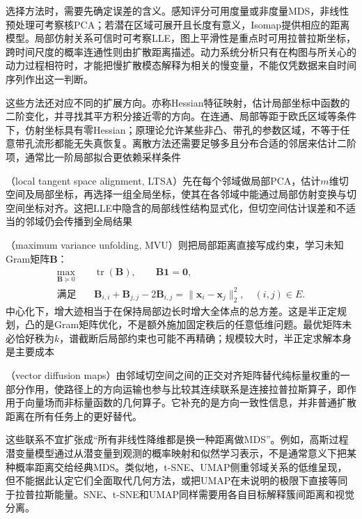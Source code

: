 选择方法时，需要先确定误差的含义。感知评分可用度量或非度量MDS，非线性预处理可考察核PCA；若潜在区域可展开且长度有意义，Isomap提供相应的距离模型。局部仿射关系可信时可考察LLE，图上平滑性是重点时可用拉普拉斯坐标，跨时间尺度的概率连通性则由扩散距离描述。动力系统分析只有在构图与所关心的动力过程相符时，才能把慢扩散模态解释为相关的慢变量，不能仅凭数据来自时间序列作出这一判断。

这些方法还对应不同的扩展方向。亦称Hessian特征映射，估计局部坐标中函数的二阶变化，并寻找其平方积分接近零的方向。在连通、局部等距于欧氏区域等条件下，仿射坐标具有零Hessian；原理论允许某些非凸、带孔的参数区域，不等于任意带孔流形都能无失真恢复。离散方法还需要足够多且分布合适的邻居来估计二阶项，通常比一阶局部拟合更依赖采样条件

（local tangent space alignment, LTSA）先在每个邻域做局部PCA，估计$m$维切空间及局部坐标，再选择一组全局坐标，使其在各邻域中能通过局部仿射变换与切空间坐标对齐。这把LLE中隐含的局部线性结构显式化，但切空间估计误差和不适当的邻域仍会传播到全局结果

（maximum variance unfolding, MVU）则把局部距离直接写成约束，学习未知Gram矩阵$\bm{B}$：
\[
  \begin{aligned}
    \max_{\bm{B}\succeq0}\quad&
      \operatorname{tr}(\bm{B}),\qquad \bm{B}\bm{1}=\bm{0},\\
    \text{满足}\quad&
      \bm{B}_{i,i}+\bm{B}_{j,j}-2\bm{B}_{i,j}
      =\lVert\bm{x}_i-\bm{x}_j\rVert_2^2,\quad(i,j)\in E.
  \end{aligned}
\]
中心化下，增大迹相当于在保持局部边长时增大全体点的总方差。这是半正定规划，凸的是Gram矩阵优化，不是额外施加固定秩后的任意低维问题。最优矩阵未必恰好秩为$k$，谱截断后局部约束也可能不再精确；规模较大时，半正定求解本身是主要成本

（vector diffusion maps）由邻域切空间之间的正交对齐矩阵替代纯标量权重的一部分作用，使路径上的方向运输也参与比较其连续联系是连接拉普拉斯算子，即作用于向量场而非标量函数的几何算子。它补充的是方向一致性信息，并非普通扩散距离在所有任务上的更好替代。

这些联系不宜扩张成“所有非线性降维都是换一种距离做MDS”。例如，高斯过程潜变量模型通过从潜变量到观测的概率映射和似然学习表示，不是通常意义下把某种概率距离交给经典MDS。类似地，t-SNE、UMAP侧重邻域关系的低维呈现，但不能据此认定它们全面取代几何方法，或把UMAP在未说明的极限下直接等同于拉普拉斯能量。SNE、t-SNE和UMAP同样需要用各自目标解释簇间距离和视觉分离。

